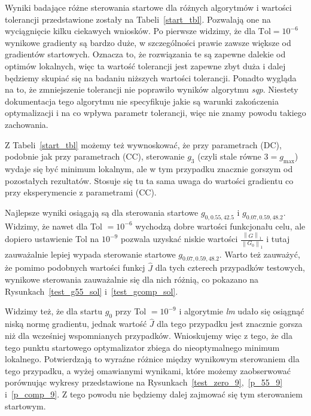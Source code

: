 \documentclass[11pt]{article}
\newcommand{\norm}[1]{\left\lVert#1\right\rVert}
\begin{document}
Wyniki badające różne sterowania startowe dla różnych algorytmów i wartości tolerancji przedstawione zostały na Tabeli~\ref{start_tbl}. Pozwalają one na wyciągnięcie kilku ciekawych wniosków. Po pierwsze widzimy, że dla $\text{Tol} = 10^{-6}$ wynikowe gradienty są bardzo duże, w szczególności prawie zawsze większe od gradientów startowych. Oznacza to, że rozwiązania te są zapewne dalekie od optimów lokalnych, więc ta wartość tolerancji jest zapewne zbyt duża i dalej będziemy skupiać się na badaniu niższych wartości tolerancji. Ponadto wygląda na to, że zmniejszenie tolerancji nie poprawiło wyników algorytmu {\it sqp}. Niestety dokumentacja tego algorytmu nie specyfikuje jakie są warunki zakończenia optymalizacji i na co wpływa parametr tolerancji, więc nie znamy powodu takiego zachowania.

Z Tabeli~\ref{start_tbl} możemy też wywnoskować, że przy parametrach (DC), podobnie jak przy parametrach (CC), sterowanie $g_3$ (czyli stale równe $3 = g_{\max}$) wydaje się być minimum lokalnym, ale w tym przypadku znacznie gorszym od pozostałych rezultatów. Stosuje się tu ta sama uwaga do wartości gradientu co przy eksperymencie z parametrami (CC).

Najlepsze wyniki osiągają są dla sterowania startowe $g_{0,0.55,42.5}$ i $g_{0.07,0.59,48.2}$. Widzimy, że nawet dla Tol $= 10^{-6}$ wychodzą dobre wartości funkcjonału celu, ale dopiero ustawienie Tol na $10^{-9}$ pozwala uzyskać niskie wartości $\frac{\norm{G}_1}{\norm{G_0}_1}$ i tutaj zauważalnie lepiej wypada sterowanie startowe $g_{0.07,0.59,48.2}$. Warto też zauważyć, że pomimo podobnych wartości funkcj $\hat{J}$ dla tych czterech przypadków testowych, wynikowe sterowania zauważalnie się dla nich różnią, co pokazano na Rysunkach~\ref{test_g55_sol} i~\ref{test_gcomp_sol}.

Widzimy też, że dla startu $g_0$ przy Tol $= 10^{-9}$ i algorytmie {\it lm\/} udało się osiągnąć niską normę gradientu, jednak wartość $\hat{J}$ dla tego przypadku jest znacznie gorsza niż dla wcześniej wspomnianych przypadków. Wnioskujemy więc z tego, że dla tego punktu startowego optymalizator zbiega do nieoptymalnego minimum lokalnego. Potwierdzają to wyraźne różnice między wynikowym sterowaniem dla tego przypadku, a wyżej omawianymi wynikami, które możemy zaobserwować porównując wykresy przedstawione na Rysunkach~\ref{test_zero_9},~\ref{p_55_9} i~\ref{p_comp_9}. Z tego powodu nie będziemy dalej zajmować się tym sterowaniem startowym.
\end{document}

